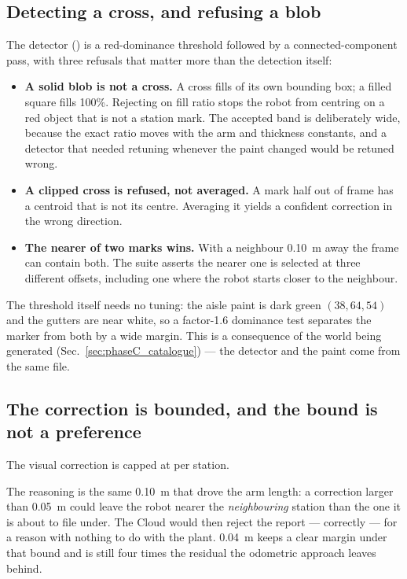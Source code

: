 \subsection{Detecting a cross, and refusing a blob}

The detector () is a red-dominance threshold
followed by a connected-component pass, with three refusals that matter
more than the detection itself:

\begin{itemize}[leftmargin=*,itemsep=1pt,topsep=2pt]
  \item \textbf{A solid blob is not a cross.} A cross fills
         of its own bounding box; a filled square
        fills 100\%. Rejecting on fill ratio stops the robot from
        centring on a red object that is not a station mark. The
        accepted band is deliberately wide, because the exact ratio
        moves with the arm and thickness constants, and a detector that
        needed retuning whenever the paint changed would be retuned
        wrong.
  \item \textbf{A clipped cross is refused, not averaged.} A mark half
        out of frame has a centroid that is not its centre. Averaging it
        yields a confident correction in the wrong direction.
  \item \textbf{The nearer of two marks wins.} With a neighbour
        \SI{0.10}{m} away the frame can contain both. The suite asserts
        the nearer one is selected at three different offsets, including
        one where the robot starts closer to the neighbour.
\end{itemize}

The threshold itself needs no tuning: the aisle paint is dark green
$(38, 64, 54)$ and the gutters are near white, so a factor-1.6 dominance
test separates the marker from both by a wide margin. This is a
consequence of the world being generated (Sec.~\ref{sec:phaseC_catalogue})
--- the detector and the paint come from the same file.

\subsection{The correction is bounded, and the bound is not a preference}

The visual correction is capped at  per station.

The reasoning is the same \SI{0.10}{m} that drove the arm length: a
correction larger than \SI{0.05}{m} could leave the robot nearer the
\emph{neighbouring} station than the one it is about to file under. The
Cloud would then reject the report --- correctly --- for a reason with
nothing to do with the plant. \SI{0.04}{m} keeps a clear margin under
that bound and is still four times the residual the odometric approach
leaves behind.

